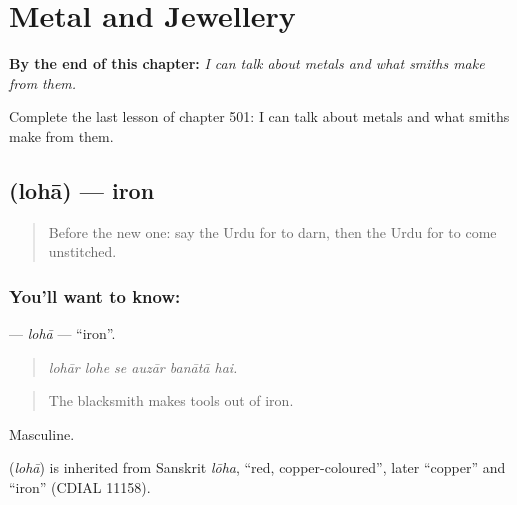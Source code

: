 
\chapter{Metal and Jewellery}
\label{ch:ur-metal-and-jewellery}

\begin{chapteropening}
\textbf{By the end of this chapter:} \emph{I can talk about metals and what smiths make from them.}

Complete the last lesson of chapter 501: I can talk about metals and what smiths make from them.
\end{chapteropening}

\section[\texorpdfstring{\ur{لوہا} (lohā)}{لوہا (lohā)}]{ (lohā) — iron}

\label{lesson:UR-C501-loha}



\begin{quote}
Before the new one: say the Urdu for to darn, then the Urdu for to come unstitched.
\end{quote}

\subsection*{You'll want to know: }
\textbf{} — \emph{lohā} — \textquotedblleft{}iron\textquotedblright{}.

\begin{quote}
     
\end{quote}

\begin{quote}
\emph{lohār lohe se auzār banātā hai.}
\end{quote}

\begin{quote}
The blacksmith makes tools out of iron.
\end{quote}

Masculine.

\begin{cousinweb}
\textbf{} (\emph{lohā}) is inherited from Sanskrit \emph{lōha}, \textquotedblleft{}red, copper-coloured\textquotedblright{}, later \textquotedblleft{}copper\textquotedblright{} and \textquotedblleft{}iron\textquotedblright{} (CDIAL 11158).
\end{cousinweb}

